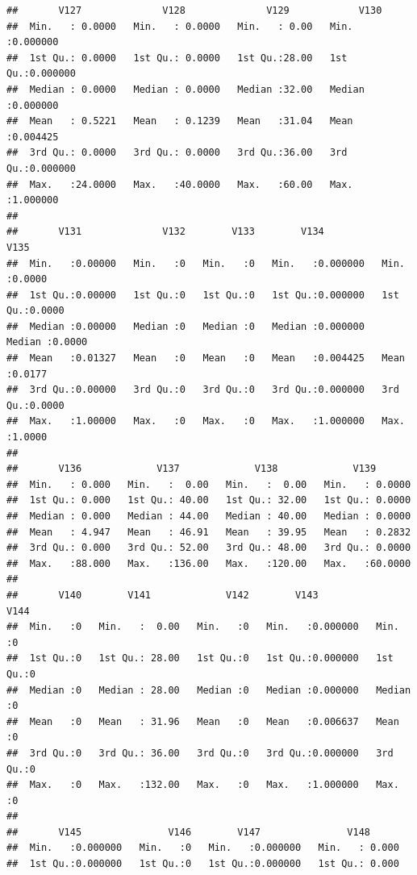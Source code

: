 \documentclass[
]{article}
\begin{document}
\begin{verbatim}
##       V127              V128              V129            V130         
##  Min.   : 0.0000   Min.   : 0.0000   Min.   : 0.00   Min.   :0.000000  
##  1st Qu.: 0.0000   1st Qu.: 0.0000   1st Qu.:28.00   1st Qu.:0.000000  
##  Median : 0.0000   Median : 0.0000   Median :32.00   Median :0.000000  
##  Mean   : 0.5221   Mean   : 0.1239   Mean   :31.04   Mean   :0.004425  
##  3rd Qu.: 0.0000   3rd Qu.: 0.0000   3rd Qu.:36.00   3rd Qu.:0.000000  
##  Max.   :24.0000   Max.   :40.0000   Max.   :60.00   Max.   :1.000000  
##                                                                        
##       V131              V132        V133        V134               V135       
##  Min.   :0.00000   Min.   :0   Min.   :0   Min.   :0.000000   Min.   :0.0000  
##  1st Qu.:0.00000   1st Qu.:0   1st Qu.:0   1st Qu.:0.000000   1st Qu.:0.0000  
##  Median :0.00000   Median :0   Median :0   Median :0.000000   Median :0.0000  
##  Mean   :0.01327   Mean   :0   Mean   :0   Mean   :0.004425   Mean   :0.0177  
##  3rd Qu.:0.00000   3rd Qu.:0   3rd Qu.:0   3rd Qu.:0.000000   3rd Qu.:0.0000  
##  Max.   :1.00000   Max.   :0   Max.   :0   Max.   :1.000000   Max.   :1.0000  
##                                                                               
##       V136             V137             V138             V139        
##  Min.   : 0.000   Min.   :  0.00   Min.   :  0.00   Min.   : 0.0000  
##  1st Qu.: 0.000   1st Qu.: 40.00   1st Qu.: 32.00   1st Qu.: 0.0000  
##  Median : 0.000   Median : 44.00   Median : 40.00   Median : 0.0000  
##  Mean   : 4.947   Mean   : 46.91   Mean   : 39.95   Mean   : 0.2832  
##  3rd Qu.: 0.000   3rd Qu.: 52.00   3rd Qu.: 48.00   3rd Qu.: 0.0000  
##  Max.   :88.000   Max.   :136.00   Max.   :120.00   Max.   :60.0000  
##                                                                      
##       V140        V141             V142        V143               V144  
##  Min.   :0   Min.   :  0.00   Min.   :0   Min.   :0.000000   Min.   :0  
##  1st Qu.:0   1st Qu.: 28.00   1st Qu.:0   1st Qu.:0.000000   1st Qu.:0  
##  Median :0   Median : 28.00   Median :0   Median :0.000000   Median :0  
##  Mean   :0   Mean   : 31.96   Mean   :0   Mean   :0.006637   Mean   :0  
##  3rd Qu.:0   3rd Qu.: 36.00   3rd Qu.:0   3rd Qu.:0.000000   3rd Qu.:0  
##  Max.   :0   Max.   :132.00   Max.   :0   Max.   :1.000000   Max.   :0  
##                                                                         
##       V145               V146        V147               V148       
##  Min.   :0.000000   Min.   :0   Min.   :0.000000   Min.   : 0.000  
##  1st Qu.:0.000000   1st Qu.:0   1st Qu.:0.000000   1st Qu.: 0.000  

\end{verbatim}
\end{document}
